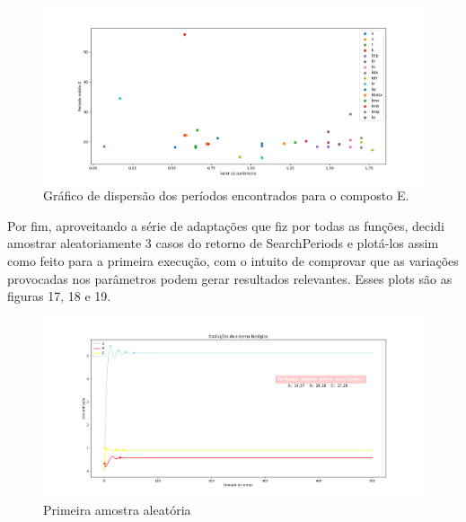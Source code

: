 \documentclass[brazilian,12pt,a4paper,final]{article}
\begin{document}
	\begin{figure}[hbtp]
		\begin{center}
			\includegraphics[width=16cm]{ParamsE.png}
			\caption{Gráfico de dispersão dos períodos encontrados para o composto E.}
			\label{fig}
		\end{center}
	\end{figure}
	\vspace{0.5cm}
	
	Por fim, aproveitando a série de adaptações que fiz por todas as funções, decidi amostrar aleatoriamente 3 casos do retorno de SearchPeriods e plotá-los assim como feito para a primeira execução, com o intuito de comprovar que as variações provocadas nos parâmetros podem gerar resultados relevantes. Esses plots são as figuras 17, 18 e 19.
	
		\begin{figure}[hbtp]
		\begin{center}
			\includegraphics[width=16cm]{Sample1.png}
			\caption{Primeira amostra aleatória}
			\label{fig}
		\end{center}
	\end{figure}
	
\end{document}
